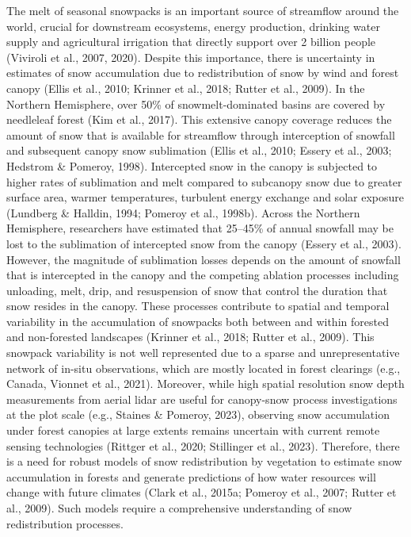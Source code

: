 \documentclass[
  letterpaper,
]{tex/uofsthesis-cs}
\begin{document}
The melt of seasonal snowpacks is an important source of streamflow
around the world, crucial for downstream ecosystems, energy production,
drinking water supply and agricultural irrigation that directly support
over 2 billion people (Viviroli et al., 2007, 2020). Despite this
importance, there is uncertainty in estimates of snow accumulation due
to redistribution of snow by wind and forest canopy (Ellis et al., 2010;
Krinner et al., 2018; Rutter et al., 2009). In the Northern Hemisphere,
over 50\% of snowmelt-dominated basins are covered by needleleaf forest
(Kim et al., 2017). This extensive canopy coverage reduces the amount of
snow that is available for streamflow through interception of snowfall
and subsequent canopy snow sublimation (Ellis et al., 2010; Essery et
al., 2003; Hedstrom \& Pomeroy, 1998). Intercepted snow in the canopy is
subjected to higher rates of sublimation and melt compared to subcanopy
snow due to greater surface area, warmer temperatures, turbulent energy
exchange and solar exposure (Lundberg \& Halldin, 1994; Pomeroy et al.,
1998b). Across the Northern Hemisphere, researchers have estimated that
25--45\% of annual snowfall may be lost to the sublimation of
intercepted snow from the canopy (Essery et al., 2003). However, the
magnitude of sublimation losses depends on the amount of snowfall that
is intercepted in the canopy and the competing ablation processes
including unloading, melt, drip, and resuspension of snow that control
the duration that snow resides in the canopy. These processes contribute
to spatial and temporal variability in the accumulation of snowpacks
both between and within forested and non-forested landscapes (Krinner et
al., 2018; Rutter et al., 2009). This snowpack variability is not well
represented due to a sparse and unrepresentative network of in-situ
observations, which are mostly located in forest clearings (e.g.,
Canada, Vionnet et al., 2021). Moreover, while high spatial resolution
snow depth measurements from aerial lidar are useful for canopy-snow
process investigations at the plot scale (e.g., Staines \& Pomeroy,
2023), observing snow accumulation under forest canopies at large
extents remains uncertain with current remote sensing technologies
(Rittger et al., 2020; Stillinger et al., 2023). Therefore, there is a
need for robust models of snow redistribution by vegetation to estimate
snow accumulation in forests and generate predictions of how water
resources will change with future climates (Clark et al., 2015a; Pomeroy
et al., 2007; Rutter et al., 2009). Such models require a comprehensive
understanding of snow redistribution processes.
\end{document}
